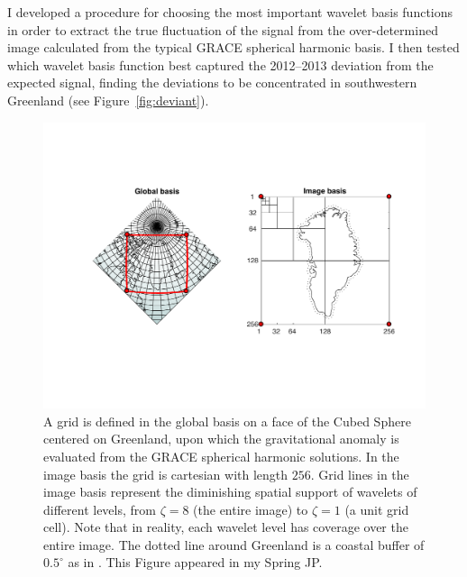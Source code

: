 \documentclass[11pt]{report}
\begin{document}
I developed a procedure for choosing the most important wavelet basis functions in order to extract the true fluctuation of the signal from the over-determined image calculated from the typical GRACE spherical harmonic basis. I then tested which wavelet basis function best captured the 2012--2013 deviation from the expected signal, finding the deviations to be concentrated in southwestern Greenland (see
Figure~\ref{fig:deviant}). 

\begin{figure}[h]
\centering
\includegraphics[width=1.1\linewidth]{Figures/thegrid.pdf}
\caption[The Discrete Grid Around Greenland]{A grid is defined in the global basis on a face of the Cubed Sphere centered on Greenland, upon which the gravitational anomaly is evaluated from the GRACE spherical harmonic solutions. In the image basis the grid is cartesian with length $256$. Grid lines in the image basis represent the diminishing spatial support of wavelets of different levels, from $\zeta=8$ (the entire image) to $\zeta=1$ (a unit grid cell). Note that in reality, each wavelet level has coverage over the entire image. The dotted line around Greenland is a coastal buffer of $0.5^{\circ}$ as in \cite{Harig+2016}. This Figure appeared in my Spring JP.} \label{fig:thegrid}
\end{figure}



\end{document}
